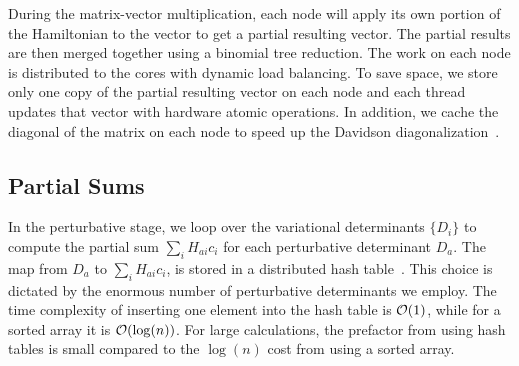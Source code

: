 \documentclass[%
reprint,
 superscriptaddress,
 amsmath,amssymb,
 aps,
]{revtex4-1}
\begin{document}
During the matrix-vector multiplication, each node will apply its own portion of the Hamiltonian to the vector to get a partial resulting vector.
The partial results are then merged together using a binomial tree reduction.
The work on each node is distributed to the cores with dynamic load balancing.
To save space, we store only one copy of the partial resulting vector on each node and each thread updates that vector with hardware atomic operations.
In addition, we cache the diagonal of the matrix on each node to speed up the Davidson diagonalization~\cite{Dav-CPC-89}.

\subsection{Partial Sums}
%
%

In the perturbative stage, we loop over the variational determinants $\{D_i\}$ to compute the partial sum $\sum_i H_{ai}c_{i}$
for each perturbative determinant $D_a$.
The map from $D_a$ to $\sum_i H_{ai}c_{i}$, is stored in a distributed hash table~\cite{DHT}.
This choice is dictated by the enormous number of perturbative determinants we employ.
The time complexity of inserting one element into the hash table is ${\cal O}(1)$, while for a sorted array it is ${\cal O}(\log(n))$.
For large calculations, the prefactor from using hash tables is small compared to the $\log(n)$ cost from using a sorted array.
\end{document}
